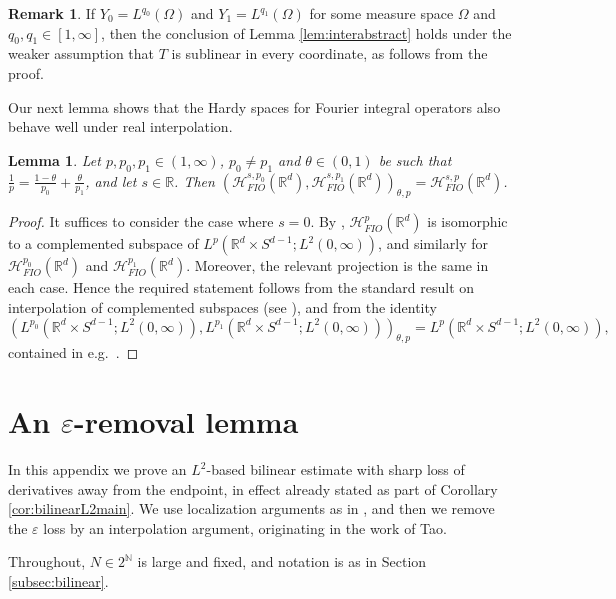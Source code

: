 \documentclass{amsart}
\numberwithin{equation}{section}
\newtheorem{lemma}[theorem]{Lemma}
\theoremstyle{definition}
\newtheorem{remark}[theorem]{Remark}
\newcommand{\R}{\mathbb{R}}
\newcommand{\Rd}{\mathbb{R}^{d}}
\newcommand{\N}{\mathbb{N}}
\newcommand {\HT}{\mathcal{H}}
\newcommand {\Hp}{\mathcal{H}^{p}_{FIO}(\R^d)}
\newcommand {\Hps}{\mathcal{H}^{s,p}_{FIO}(\R^d)}
\begin{document}
\begin{remark}\label{rem:sublinear}
If $Y_{0}=L^{q_{0}}(\Omega)$ and $Y_{1}=L^{q_{1}}(\Omega)$ for some measure space $\Omega$ and $q_{0},q_{1}\in[1,\infty]$, then the conclusion of Lemma \ref{lem:interabstract} holds under the weaker assumption that $T$ is sublinear in every coordinate, as follows from the proof. 
\end{remark}

Our next lemma shows that the Hardy spaces for Fourier integral operators also behave well under real interpolation.

\begin{lemma}\label{lem:interHpFIO}
Let $p,p_{0},p_{1}\in(1,\infty)$, $p_0 \neq p_1$ and $\theta\in(0,1)$ be such that $\frac{1}{p}=\frac{1-\theta}{p_{0}}+\frac{\theta}{p_{1}}$, and let $s\in\R$. Then $(\HT^{s,p_{0}}_{FIO}(\Rd),\HT^{s,p_{1}}_{FIO}(\Rd))_{\theta,p}=\Hps$.
\end{lemma}
\begin{proof}
It suffices to consider the case where $s=0$. By \cite[Theorem 3.4 and Proposition 4.3]{HaPoRoYu26}, $\Hp$ is isomorphic to a complemented subspace of $L^{p}(\R^{d}\times S^{d-1};L^{2}(0,\infty))$, and similarly for $\HT^{p_{0}}_{FIO}(\Rd)$ and $\HT^{p_{1}}_{FIO}(\Rd)$. Moreover, the relevant projection is the same in each case. Hence the required statement follows from the standard result on interpolation of complemented subspaces (see \cite[Theorem 1.17.1.1]{Triebel78}), and from the identity
\[
(L^{p_{0}}(\R^{d}\times S^{d-1};L^{2}(0,\infty)),L^{p_{1}}(\R^{d}\times S^{d-1};L^{2}(0,\infty)))_{\theta,p}=L^{p}(\R^{d}\times S^{d-1};L^{2}(0,\infty)),
\]
contained in e.g.~\cite[Theorem 5.2.1]{Bergh-Lofstrom76}.
\end{proof}
\section{An $\varepsilon$-removal lemma}\label{sec:noeps}

In this appendix we prove an $L^{2}$-based bilinear estimate with sharp loss of derivatives away from the endpoint, in effect already stated as part of Corollary \ref{cor:bilinearL2main}. We use localization arguments as in \cite{SchippaTataru2025}, and then we remove the $\varepsilon$ loss by an interpolation argument, originating in the work \cite{Tao1999} of Tao.

Throughout, $N\in 2^{\N}$ is large and fixed, %
and notation is as in Section \ref{subsec:bilinear}.
\end{document}
